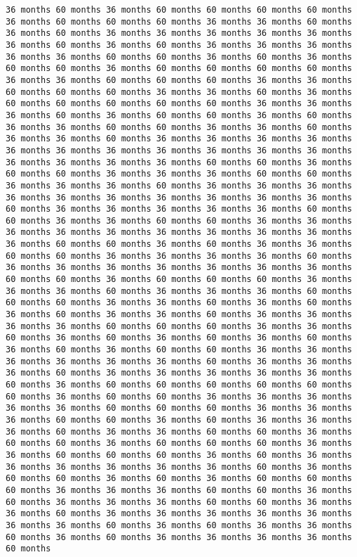\documentclass[11pt]{article}
\begin{document}
\begin{Verbatim}[commandchars=\\\{\}, frame=single, framerule=2mm, rulecolor=\color{outerrorbackground}]
36 months 60 months 36 months 60 months 60 months 60 months 60 months 36 months 60 months 60 months 60 months 36 months 36 months 60 months 36 months 60 months 36 months 36 months 36 months 36 months 36 months 36 months 60 months 36 months 60 months 36 months 36 months 36 months 36 months 36 months 60 months 60 months 36 months 60 months 36 months 60 months 60 months 36 months 60 months 60 months 60 months 60 months 36 months 36 months 60 months 60 months 60 months 36 months 36 months 60 months 60 months 60 months 36 months 36 months 60 months 36 months 60 months 60 months 60 months 60 months 60 months 36 months 36 months 36 months 60 months 36 months 60 months 60 months 36 months 60 months 36 months 36 months 60 months 60 months 36 months 36 months 60 months 36 months 36 months 60 months 36 months 36 months 36 months 36 months 36 months 36 months 36 months 36 months 36 months 36 months 36 months 36 months 36 months 36 months 36 months 60 months 60 months 36 months 60 months 60 months 36 months 36 months 36 months 60 months 60 months 36 months 36 months 36 months 60 months 36 months 36 months 36 months 36 months 36 months 36 months 36 months 36 months 36 months 36 months 60 months 36 months 36 months 36 months 36 months 36 months 60 months 60 months 36 months 36 months 60 months 60 months 36 months 36 months 36 months 36 months 36 months 36 months 36 months 36 months 36 months 36 months 60 months 60 months 36 months 60 months 36 months 36 months 60 months 60 months 36 months 36 months 36 months 36 months 60 months 36 months 36 months 36 months 36 months 36 months 36 months 36 months 60 months 60 months 36 months 60 months 60 months 60 months 36 months 36 months 36 months 60 months 36 months 36 months 36 months 60 months 60 months 60 months 36 months 36 months 60 months 36 months 60 months 36 months 60 months 36 months 36 months 60 months 36 months 36 months 36 months 36 months 60 months 60 months 60 months 36 months 36 months 60 months 36 months 60 months 36 months 60 months 36 months 60 months 36 months 60 months 36 months 60 months 60 months 36 months 36 months 36 months 36 months 36 months 36 months 60 months 36 months 36 months 36 months 60 months 36 months 36 months 36 months 36 months 36 months 60 months 36 months 60 months 60 months 60 months 60 months 60 months 60 months 36 months 60 months 60 months 36 months 36 months 36 months 36 months 36 months 60 months 60 months 60 months 36 months 36 months 36 months 60 months 60 months 36 months 60 months 36 months 36 months 36 months 60 months 36 months 36 months 60 months 60 months 36 months 60 months 60 months 36 months 60 months 60 months 60 months 36 months 36 months 60 months 60 months 60 months 36 months 60 months 36 months 36 months 36 months 36 months 36 months 36 months 60 months 36 months 60 months 60 months 36 months 60 months 36 months 60 months 60 months 60 months 36 months 36 months 36 months 60 months 60 months 36 months 60 months 36 months 36 months 36 months 60 months 60 months 36 months 36 months 60 months 36 months 36 months 36 months 36 months 36 months 36 months 36 months 60 months 36 months 60 months 36 months 36 months 60 months 36 months 60 months 36 months 36 months 36 months 36 months 60 months 
\end{Verbatim}
\end{document}
